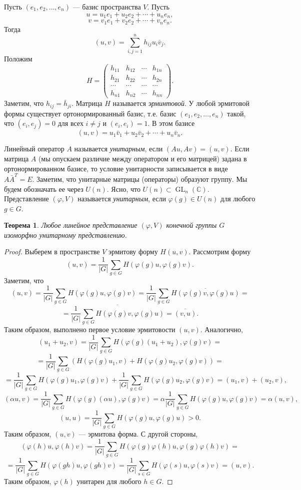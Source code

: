 \documentclass[12pt, titlepage, oneside]{amsbook}
\newcommand{\GL}{\operatorname{GL}}
\newcommand{\CC}{\mathbb{C}}
\newtheorem{theorem}{Теорема}[chapter]
\theoremstyle{definition}
\theoremstyle{remark}
\begin{document}
Пусть $(e_1,e_2,\ldots, e_n)$ --- базис пространства $V$. Пусть $$u=u_1e_1+u_2e_2+\cdots+u_ne_n,$$ $$v=v_1e_1+v_2e_2+\cdots+v_ne_n.$$ Тогда $$(u,v)=\sum\limits_{i,j=1}^n h_{ij}u_i\bar{v}_j.$$ Положим $$H=\begin{pmatrix} h_{11} & h_{12} & \cdots & h_{1n} \\
                h_{21} & h_{22} & \cdots & h_{2n} \\
                \cdots & \cdots & \cdots & \cdots \\
                h_{n1} & h_{n2} & \cdots & h_{nn}\end{pmatrix}.$$ Заметим, что $h_{ij}=\bar{h}_{ji}$. Матрица $H$ называется \emph{эрминтовой}. У любой эрмитовой формы существует ортонормированный базис, т.е. базис $(e_1,e_2,\ldots, e_n)$  такой, что $(e_i,e_j)=0$ для всех $i\neq j$ и $(e_i,e_i)=1$. В этом базисе $$(u,v)=u_1\bar{v}_1+u_2\bar{v}_2+\cdots+u_n\bar{v}_n.$$

Линейный оператор $A$ называется \emph{унитарным}, если $(Au,Av)=(u,v)$. Если матрица $A$ (мы опускаем различие между оператором и его матрицей) задана в ортонормированном базисе, то условие унитарности записывается в виде $A\bar{A}^T=E$. Заметим, что унитарные матрицы (операторы) образуют группу. Мы будем обозначать ее через $U(n)$. Ясно, что $U(n)\subset\GL_n(\CC)$. Представление $(\varphi,V)$ называется \emph{унитарным}, если $\varphi(g)\in U(n)$ для любого $g\in G$.

\begin{theorem}
	\label{PredGr1}
	Любое линейное представление $(\varphi,V)$ конечной группы $G$ изоморфно унитарному представлению.
\end{theorem}

\begin{proof}
	Выберем в пространстве $V$ эрмитову форму $H(u,v)$. Рассмотрим форму $$(u,v)=\frac{1}{|G|}\sum\limits_{g\in G} H(\varphi(g)u,\varphi(g)v).$$ Заметим, что $$(u,v)=\frac{1}{|G|}\sum\limits_{g\in G} H(\varphi(g)u,\varphi(g)v)=\frac{1}{|G|}\sum\limits_{g\in G} \overline{H(\varphi(g)v,\varphi(g)u)}=$$ $$=\overline{\frac{1}{|G|}\sum\limits_{g\in G} H(\varphi(g)v,\varphi(g)u)}=\overline{(v,u)}.$$ Таким образом, выполнено первое условие эрмитовости $(u,v)$. Аналогично, $$(u_1+u_2,v)=\frac{1}{|G|}\sum\limits_{g\in G} H(\varphi(g)(u_1+u_2),\varphi(g)v)=$$ $$=\frac{1}{|G|}\sum\limits_{g\in G} (H(\varphi(g)u_1,v)+H(\varphi(g)u_2,\varphi(g)v))=$$ $$=\frac{1}{|G|}\sum\limits_{g\in G} H(\varphi(g)u_1,\varphi(g)v)+\frac{1}{|G|}\sum\limits_{g\in G} H(\varphi(g)u_2,\varphi(g)v)=(u_1,v)+(u_2,v),$$ $$(\alpha u,v)=\frac{1}{|G|}\sum\limits_{g\in G} H(\varphi(g)(\alpha u),\varphi(g)v)=\alpha\frac{1}{|G|}\sum\limits_{g\in G} H(\varphi(g)u,\varphi(g)v)=\alpha(u,v),$$ $$(u,u)=\frac{1}{|G|}\sum\limits_{g\in G} H(\varphi(g)u,\varphi(g)u)>0.$$ Таким образом, $(u,v)$ --- эрмитова форма. С другой стороны, $$(\varphi(h)u,\varphi(h) v)=\frac{1}{|G|}\sum\limits_{g\in G} H(\varphi(g)\varphi(h)u,\varphi(g)\varphi(h)v)=$$ $$=\frac{1}{|G|}\sum\limits_{g\in G} H(\varphi(gh)u,\varphi(gh)v)=\frac{1}{|G|}\sum\limits_{s\in G} H(\varphi(s)u,\varphi(s)v)=(u,v).$$ Таким образом, $\varphi(h)$ унитарен для любого $h\in G$.
\end{proof}
\end{document}

